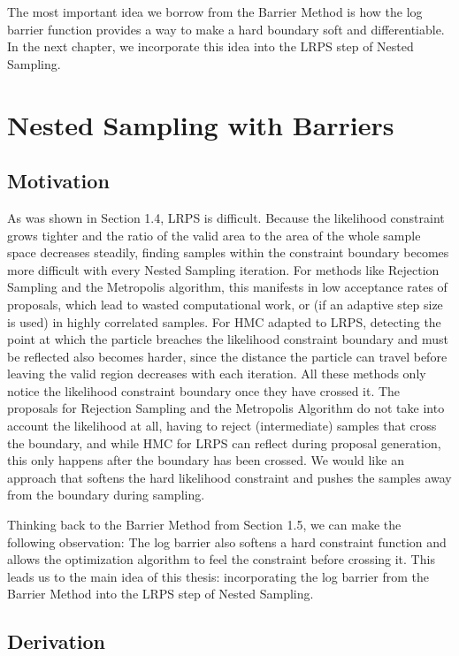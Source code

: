 \documentclass[12pt, a4paper]{report}
\begin{document}
The most important idea we borrow from the Barrier Method is how the log barrier function provides a way to make a hard boundary soft and differentiable.
In the next chapter, we incorporate this idea into the LRPS step of Nested Sampling.


\chapter{Nested Sampling with Barriers}

\section{Motivation}
As was shown in Section 1.4, LRPS is difficult.
Because the likelihood constraint grows tighter and the ratio of the valid area to the area of the whole sample space decreases steadily, finding samples within the constraint boundary becomes more difficult with every Nested Sampling iteration.
For methods like Rejection Sampling and the Metropolis algorithm, this manifests in low acceptance rates of proposals, which lead to wasted computational work, or (if an adaptive step size is used) in highly correlated samples.
For HMC adapted to LRPS, detecting the point at which the particle breaches the likelihood constraint boundary and must be reflected also becomes harder, since the distance the particle can travel before leaving the valid region decreases with each iteration.
All these methods only notice the likelihood constraint boundary once they have crossed it.
The proposals for Rejection Sampling and the Metropolis Algorithm do not take into account the likelihood at all, having to reject (intermediate) samples that cross the boundary, and while HMC for LRPS can reflect during proposal generation, this only happens after the boundary has been crossed.
We would like an approach that softens the hard likelihood constraint and pushes the samples away from the boundary during sampling.

Thinking back to the Barrier Method from Section 1.5, we can make the following observation:
The log barrier also softens a hard constraint function and allows the optimization algorithm to feel the constraint before crossing it.
This leads us to the main idea of this thesis: incorporating the log barrier from the Barrier Method into the LRPS step of Nested Sampling.

\section{Derivation}
\end{document}
